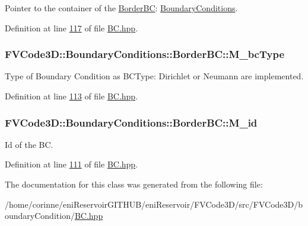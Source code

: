Pointer to the container of the \hyperlink{classFVCode3D_1_1BoundaryConditions_1_1BorderBC}{Border\+BC}\+: \hyperlink{classFVCode3D_1_1BoundaryConditions}{Boundary\+Conditions}. 



Definition at line \hyperlink{BC_8hpp_source_l00117}{117} of file \hyperlink{BC_8hpp_source}{B\+C.\+hpp}.

\subsubsection[{\texorpdfstring{M\+\_\+bc\+Type}{M_bcType}}]{ F\+V\+Code3\+D\+::\+Boundary\+Conditions\+::\+Border\+B\+C\+::\+M\+\_\+bc\+Type\hspace{0.3cm}{\ttfamily [protected]}}\hypertarget{classFVCode3D_1_1BoundaryConditions_1_1BorderBC_a2023b092c3f51b2ea04c14e544a0da6b}{}\label{classFVCode3D_1_1BoundaryConditions_1_1BorderBC_a2023b092c3f51b2ea04c14e544a0da6b}


Type of Boundary Condition as B\+C\+Type\+: Dirichlet or Neumann are implemented. 



Definition at line \hyperlink{BC_8hpp_source_l00113}{113} of file \hyperlink{BC_8hpp_source}{B\+C.\+hpp}.

\subsubsection[{\texorpdfstring{M\+\_\+id}{M_id}}]{ F\+V\+Code3\+D\+::\+Boundary\+Conditions\+::\+Border\+B\+C\+::\+M\+\_\+id\hspace{0.3cm}{\ttfamily [protected]}}\hypertarget{classFVCode3D_1_1BoundaryConditions_1_1BorderBC_aa4986bb3130dc4081573343d4e82f8a5}{}\label{classFVCode3D_1_1BoundaryConditions_1_1BorderBC_aa4986bb3130dc4081573343d4e82f8a5}


Id of the BC. 



Definition at line \hyperlink{BC_8hpp_source_l00111}{111} of file \hyperlink{BC_8hpp_source}{B\+C.\+hpp}.



The documentation for this class was generated from the following file\+:\begin{DoxyCompactItemize}
\item 
/home/corinne/eni\+Reservoir\+G\+I\+T\+H\+U\+B/eni\+Reservoir/\+F\+V\+Code3\+D/src/\+F\+V\+Code3\+D/boundary\+Condition/\hyperlink{BC_8hpp}{B\+C.\+hpp}\end{DoxyCompactItemize}
